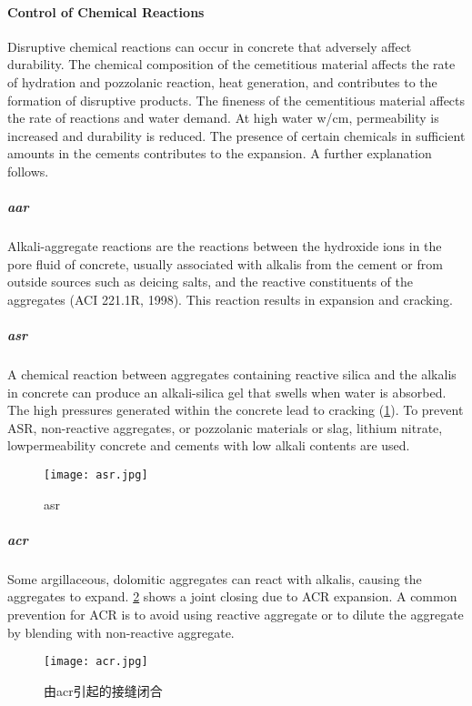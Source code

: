 \paragraph{Control of Chemical Reactions}
Disruptive chemical reactions can occur in concrete that adversely affect durability. The chemical composition of the cemetitious material affects the rate of hydration and pozzolanic reaction, heat generation, and contributes to the formation of disruptive products. The fineness of the cementitious material affects the rate of reactions and water demand. At high water w/cm, permeability is increased and durability is reduced. The presence of certain chemicals in sufficient amounts in the cements contributes to the expansion. A further explanation follows.

\subparagraph{\acrfull*{aar}}
Alkali-aggregate reactions are the reactions between the hydroxide ions in the pore fluid of concrete, usually associated with alkalis from the cement or from outside sources such as deicing salts, and the reactive constituents of the aggregates (ACI 221.1R, 1998). This reaction results in expansion and cracking.
\subparagraph{\acrfull*{asr}}
A chemical reaction between aggregates containing reactive silica and the alkalis in concrete can produce an alkali-silica gel that swells when water is absorbed. The high pressures generated within the concrete lead to cracking (\cref{fig:asr}). To prevent ASR, non-reactive aggregates, or pozzolanic materials or slag, lithium nitrate, lowpermeability concrete and cements with low alkali contents are used.

\begin{figure}
  \texttt{[image: asr.jpg]}
  \caption{\acrlong*{asr}}
  \label{fig:asr}
\end{figure}

\subparagraph{\acrfull*{acr}}
Some argillaceous, dolomitic aggregates can react with alkalis, causing the aggregates to expand. \cref{fig:acr} shows a joint closing due to ACR expansion. A common prevention for ACR is to avoid using reactive aggregate or to dilute the aggregate by blending with non-reactive aggregate.

\begin{figure}
  \texttt{[image: acr.jpg]}
  \caption{由\acrlong*{acr}引起的接缝闭合}
  \label{fig:acr}
\end{figure}

